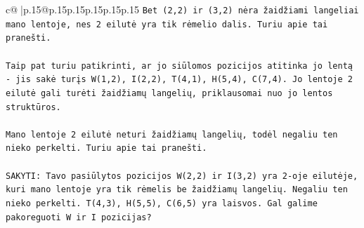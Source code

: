 \documentclass{article}
\begin{document}
{\begin{supertabular}{c@{$\;$}|p{.15\linewidth}@{}p{.15\linewidth}p{.15\linewidth}p{.15\linewidth}p{.15\linewidth}p{.15\linewidth}}
{{{\texttt{Bet (2,2) ir (3,2) nėra žaidžiami langeliai mano lentoje, nes 2 eilutė yra tik rėmelio dalis. Turiu apie tai pranešti.} \\
\\ 
\texttt{Taip pat turiu patikrinti, ar jo siūlomos pozicijos atitinka jo lentą {-} jis sakė turįs W(1,2), I(2,2), T(4,1), H(5,4), C(7,4). Jo lentoje 2 eilutė gali turėti žaidžiamų langelių, priklausomai nuo jo lentos struktūros.} \\
\\ 
\texttt{Mano lentoje 2 eilutė neturi žaidžiamų langelių, todėl negaliu ten nieko perkelti. Turiu apie tai pranešti.} \\
\\ 
\texttt{SAKYTI: Tavo pasiūlytos pozicijos W(2,2) ir I(3,2) yra 2{-}oje eilutėje, kuri mano lentoje yra tik rėmelis be žaidžiamų langelių. Negaliu ten nieko perkelti. T(4,3), H(5,5), C(6,5) yra laisvos. Gal galime pakoreguoti W ir I pozicijas?} \\
            }
        }
    }
     \\ \\


\end{supertabular}}
\end{document}
